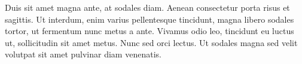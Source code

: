 \documentclass[11pt, a4paper]{awesome-cv}
\begin{document}
\begin{cvletter}
    Duis sit amet magna ante, at sodales
  diam. Aenean consectetur porta risus et sagittis. Ut interdum, enim
  varius pellentesque tincidunt, magna libero sodales tortor, ut
  fermentum nunc metus a ante. Vivamus odio leo, tincidunt eu luctus
  ut, sollicitudin sit amet metus. Nunc sed orci lectus. Ut sodales
  magna sed velit volutpat sit amet pulvinar diam venenatis.

\end{cvletter}


\makeletterclosing
\end{document}
